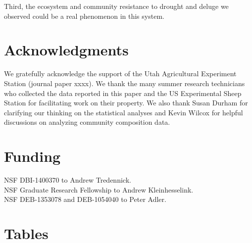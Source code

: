 \documentclass[fleqn,10pt]{wlpeerj} %
\begin{document}
Third, the ecosystem and community resistance to drought and deluge we
observed could be a real phenomenon in this system.

\section{Acknowledgments}\label{acknowledgments}

We gratefully acknowledge the support of the Utah Agricultural
Experiment Station (journal paper xxxx). We thank the many summer
research technicians who collected the data reported in this paper and
the US Experimental Sheep Station for facilitating work on their
property. We also thank Susan Durham for clarifying our thinking on the
statistical analyses and Kevin Wilcox for helpful discussions on
analyzing community composition data.

\section{Funding}\label{funding}

NSF DBI-1400370 to Andrew Tredennick.\\
NSF Graduate Research Fellowship to Andrew Kleinhesselink.\\
NSF DEB-1353078 and DEB-1054040 to Peter Adler.

\newpage{}

\section{Tables}\label{tables}
\end{document}
